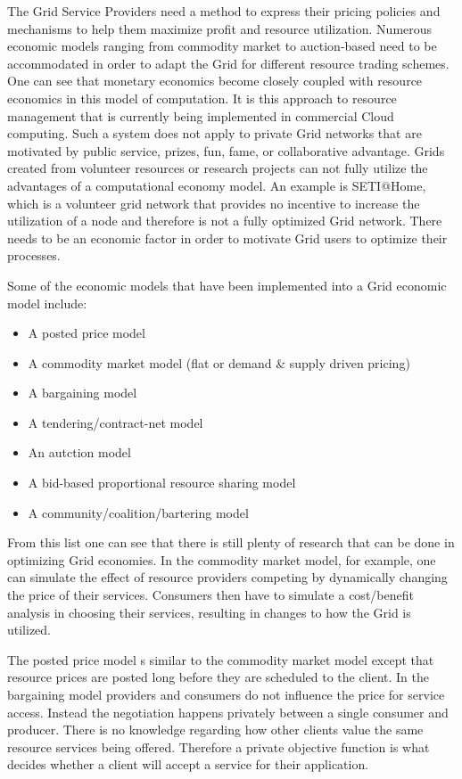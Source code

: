 \documentclass[conference]{IEEEtran}
\begin{document}
The Grid Service Providers need a method to express their pricing policies and mechanisms to help them maximize profit and resource utilization. Numerous economic models ranging from commodity market to auction-based need to be accommodated in order to adapt the Grid for different resource trading schemes. One can see that monetary economics become closely coupled with resource economics in this model of computation. It is this approach to resource management that is currently being implemented in commercial Cloud computing. Such a system does not apply to private Grid networks that are motivated by public service, prizes, fun, fame, or collaborative advantage. Grids created from volunteer resources or research projects can not fully utilize the advantages of a computational economy model. An example is SETI@Home, which is a volunteer grid network that provides no incentive to increase the utilization of a node and therefore is not a fully optimized Grid network. There needs to be an economic factor in order to motivate Grid users to optimize their processes. 

Some of the economic models that have been implemented into a Grid economic model include:
\begin{itemize}
\item A posted price model
\item A commodity market model (flat or demand \& supply driven pricing)
\item A bargaining model
\item A tendering/contract-net model
\item An autction model
\item A bid-based proportional resource sharing model
\item A community/coalition/bartering model
\end{itemize}

From this list one can see that there is still plenty of research that can be done in optimizing Grid economies. In the commodity market model, for example, one can simulate the effect of resource providers competing by dynamically changing the price of their services. Consumers then have to simulate a cost/benefit analysis in choosing their services, resulting in changes to how the Grid is utilized. 

The posted price model s similar to the commodity market model except that resource prices are posted long before they are scheduled to the client. In the bargaining model providers and consumers do not influence the price for service access. Instead the negotiation happens privately between a single consumer and producer. There is no knowledge regarding how other clients value the same resource services being offered. Therefore a private objective function is what decides whether a client will accept a service for their application. 
\end{document}

